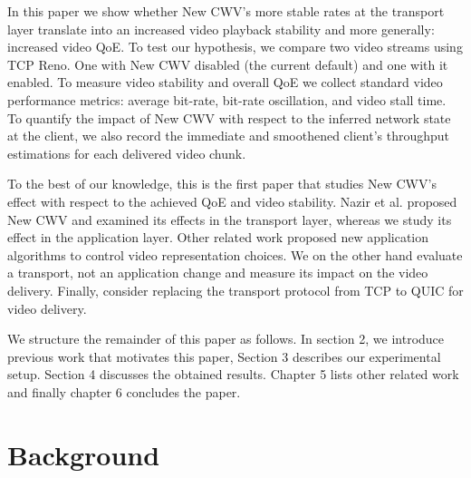 \documentclass[10pt,sigconf]{acmart}
\begin{document}
In this paper we show whether New CWV's more stable rates at the transport layer translate into an increased video playback stability and more generally: increased video QoE. To test our hypothesis, we compare two video streams using TCP Reno. One with New CWV disabled (the current default) and one with it enabled. To measure video stability and overall QoE we collect standard video performance metrics: average bit-rate, bit-rate oscillation, and video stall time. To quantify the impact of New CWV with respect to the inferred network state at the client, we also record the immediate and smoothened client's throughput estimations for each delivered video chunk.


To the best of our knowledge, this is the first paper that studies New CWV's effect with respect to the achieved QoE and video stability. Nazir et al. \cite{Nazir-2014-performance-evaluation-congestion-window-validation-dash-newcwv} proposed New CWV and examined its effects in the transport layer, whereas we study its effect in the application layer. Other related work proposed new application algorithms to control video representation choices. We on the other hand evaluate a transport, not an application change and measure its impact on the video delivery. Finally, \cite{Bhat-2017-not-so-quic} consider replacing the transport protocol from TCP to QUIC for video delivery. 


We structure the remainder of this paper as follows. In section 2, we introduce previous work that motivates this paper, Section 3 describes our experimental setup. Section 4 discusses the obtained results. Chapter 5 lists other related work and finally chapter 6 concludes the paper.

\section{Background}
\label{sec:background}
\end{document}
